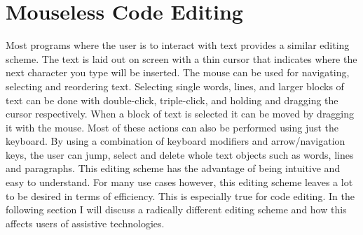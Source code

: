 \documentclass[a4paper,english]{ifimaster}
\begin{document}


\section{Mouseless Code Editing}
Most programs where the user is to interact with text provides a similar editing scheme.
The text is laid out on screen with a thin cursor that indicates where the next character you type will be inserted.
The mouse can be used for navigating, selecting and reordering text.
Selecting single words, lines, and larger blocks of text can be done with double-click, triple-click, and holding and dragging the cursor respectively.
When a block of text is selected it can be moved by dragging it with the mouse.
Most of these actions can also be performed using just the keyboard.
By using a combination of keyboard modifiers and arrow/navigation keys, the user can jump, select and delete whole text objects such as words, lines and paragraphs.
This editing scheme has the advantage of being intuitive and easy to understand.
For many use cases however, this editing scheme leaves a lot to be desired in terms of efficiency.
This is especially true for code editing.  %
In the following section I will discuss a radically different editing scheme and how this affects users of assistive technologies.
\end{document}

